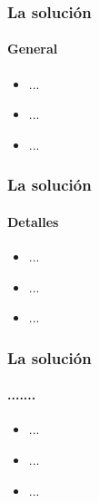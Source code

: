
\begin{frame}
\frametitle{La solución}
\framesubtitle{General}

\begin{itemize}
	\item<1-> ...
	\item<2-> ...
	\item<3-> ...
\end{itemize}
\end{frame}

\begin{frame}
\frametitle{La solución}
\framesubtitle{Detalles}

\begin{itemize}
	\item<1-> ...
	\item<2-> ...
	\item<3-> ...
\end{itemize}
\end{frame}


\begin{frame}
\frametitle{La solución}
\framesubtitle{.......}

\begin{itemize}
	\item<1-> ...
	\item<2-> ...
	\item<3-> ...
\end{itemize}
\end{frame}
